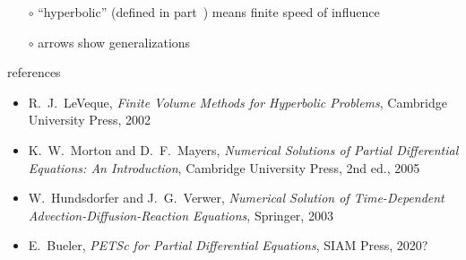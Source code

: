 \documentclass[10pt,hyperref,dvipsnames]{beamer}
\newcommand\mynum[1]{{\renewcommand{\insertenumlabel}{#1}%
      \usebeamertemplate{enumerate item} \,}}
\begin{document}
\begin{frame}[fragile]
\begin{itemize}
\begin{center}

\bigskip
    \begin{itemize}
    \item[$\circ$] ``hyperbolic'' (defined in part \mynum{2}) means finite speed of influence
    \item[$\circ$] arrows show generalizations
    \end{itemize}
\end{center}
\end{itemize}
\end{frame}


\begin{frame}{references}
\begin{itemize}
\item {\large \alert{R.~J.~LeVeque, \emph{Finite Volume Methods for Hyperbolic Problems}, Cambridge University Press, 2002}}

\bigskip
\item K.~W.~Morton and D.~F.~Mayers, \emph{Numerical Solutions of Partial Differential Equations: An Introduction}, Cambridge University Press, 2nd ed., 2005
\item W.~Hundsdorfer and J.~G.~Verwer, \emph{Numerical Solution of Time-Dependent Advection-Diffusion-Reaction Equations}, Springer, 2003
\item E.~Bueler, \emph{PETSc for Partial Differential Equations}, SIAM Press, 2020?
\end{itemize}
\end{frame}
\end{document}
